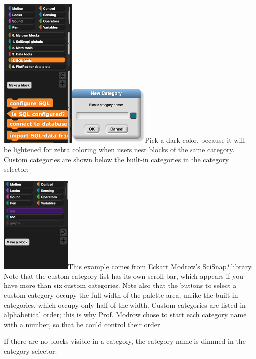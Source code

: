 \includegraphics[width=1.42986in,height=2.90972in]{media/image1060.png}\includegraphics[width=1.53in,height=1.13in]{media/image1061.png}Pick
a dark color, because it will be lightened for zebra coloring when users
nest blocks of the same category. Custom categories are shown below the
built-in categories in the category selector:

\includegraphics[width=1.35in,height=1.83958in]{media/image1062.png}This
example comes from Eckart Modrow's SciSnap\emph{!} library. Note that
the custom category list has its own scroll bar, which appears if you
have more than six custom categories. Note also that the buttons to
select a custom category occupy the full width of the palette area,
unlike the built-in categories, which occupy only half of the width.
Custom categories are listed in alphabetical order; this is why Prof.
Modrow chose to start each category name with a number, so that he could
control their order.

If there are no blocks visible in a category, the category name is
dimmed in the category selector:

